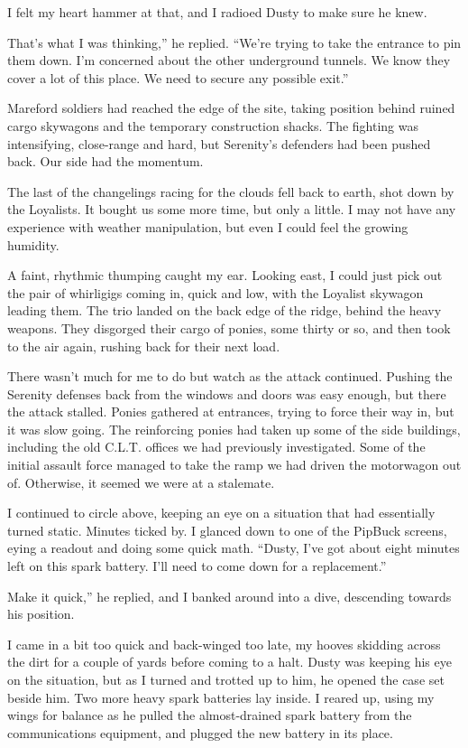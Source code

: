 I felt my heart hammer at that, and I radioed Dusty to make sure he knew.

\leavevmode{}That’s what I was thinking,” he replied. “We’re trying to take the entrance to pin them down. I’m concerned about the other underground tunnels. We know they cover a lot of this place. We need to secure any possible exit.”

Mareford soldiers had reached the edge of the site, taking position behind ruined cargo skywagons and the temporary construction shacks. The fighting was intensifying, close-range and hard, but Serenity’s defenders had been pushed back. Our side had the momentum.

The last of the changelings racing for the clouds fell back to earth, shot down by the Loyalists. It bought us some more time, but only a little. I may not have any experience with weather manipulation, but even I could feel the growing humidity.

A faint, rhythmic thumping caught my ear. Looking east, I could just pick out the pair of whirligigs coming in, quick and low, with the Loyalist skywagon leading them. The trio landed on the back edge of the ridge, behind the heavy weapons. They disgorged their cargo of ponies, some thirty or so, and then took to the air again, rushing back for their next load.

There wasn’t much for me to do but watch as the attack continued. Pushing the Serenity defenses back from the windows and doors was easy enough, but there the attack stalled. Ponies gathered at entrances, trying to force their way in, but it was slow going. The reinforcing ponies had taken up some of the side buildings, including the old C.L.T. offices we had previously investigated. Some of the initial assault force managed to take the ramp we had driven the motorwagon out of. Otherwise, it seemed we were at a stalemate.

I continued to circle above, keeping an eye on a situation that had essentially turned static. Minutes ticked by. I glanced down to one of the PipBuck screens, eying a readout and doing some quick math. “Dusty, I’ve got about eight minutes left on this spark battery. I’ll need to come down for a replacement.”

\leavevmode{}Make it quick,” he replied, and I banked around into a dive, descending towards his position.

I came in a bit too quick and back-winged too late, my hooves skidding across the dirt for a couple of yards before coming to a halt. Dusty was keeping his eye on the situation, but as I turned and trotted up to him, he opened the case set beside him. Two more heavy spark batteries lay inside. I reared up, using my wings for balance as he pulled the almost-drained spark battery from the communications equipment, and plugged the new battery in its place.

